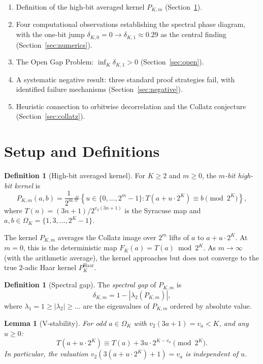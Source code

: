 \documentclass[12pt]{article}
\newtheorem{lemma}[theorem]{Lemma}
\theoremstyle{definition}
\newtheorem{definition}[theorem]{Definition}
\newcommand{\OK}{\Omega_K}
\newcommand{\vt}{v_2}
\newcommand{\Pkm}{P_{K,m}}
\begin{document}
\begin{enumerate}
\item Definition of the high-bit averaged kernel $\Pkm$ (Section~\ref{sec:def}).
\item Four computational observations establishing the spectral phase diagram, with the one-bit jump $\delta_{K,0} = 0 \to \delta_{K,1} \approx 0.29$ as the central finding (Section~\ref{sec:numerics}).
\item The Open Gap Problem: $\inf_K \delta_{K,1} > 0$ (Section~\ref{sec:open}).
\item A systematic negative result: three standard proof strategies fail, with identified failure mechanisms (Section~\ref{sec:negative}).
\item Heuristic connection to orbitwise decorrelation and the Collatz conjecture (Section~\ref{sec:collatz}).
\end{enumerate}

\section{Setup and Definitions}
\label{sec:def}

\begin{definition}[High-bit averaged kernel]
\label{def:Pkm}
For $K \geq 2$ and $m \geq 0$, the \emph{$m$-bit high-bit kernel} is
\[
  \Pkm(a,b) = \frac{1}{2^m} \#\!\left\{u \in \{0,\ldots,2^m-1\} : T(a + u \cdot 2^K) \equiv b \pmod{2^K}\right\},
\]
where $T(n) = (3n+1)/2^{\vt(3n+1)}$ is the Syracuse map and $a, b \in \OK = \{1, 3, \ldots, 2^K-1\}$.
\end{definition}

The kernel $\Pkm$ averages the Collatz image over $2^m$ lifts of $a$ to $a + u \cdot 2^K$. At $m=0$, this is the deterministic map $F_K(a) = T(a) \bmod 2^K$. As $m \to \infty$ (with the arithmetic average), the kernel approaches but does not converge to the true 2-adic Haar kernel $P_K^{\mathrm{Haar}}$.

\begin{definition}[Spectral gap]
The \emph{spectral gap} of $\Pkm$ is
\[
  \delta_{K,m} = 1 - |\lambda_2(\Pkm)|,
\]
where $\lambda_1 = 1 \geq |\lambda_2| \geq \ldots$ are the eigenvalues of $\Pkm$ ordered by absolute value.
\end{definition}

\begin{lemma}[V-stability]
\label{lem:vstab}
For odd $a \in \OK$ with $\vt(3a+1) = v_a < K$, and any $u \geq 0$:
\[
  T(a + u \cdot 2^K) \equiv T(a) + 3u \cdot 2^{K - v_a} \pmod{2^K}.
\]
In particular, the valuation $\vt(3(a+u\cdot 2^K)+1) = v_a$ is independent of $u$.
\end{lemma}
\end{document}

